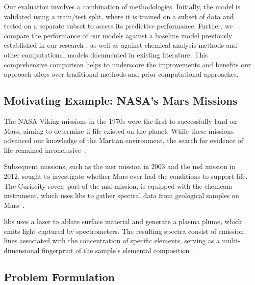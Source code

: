 Our evaluation involves a combination of methodologies. Initially, the model is validated using a train/test split, where it is trained on a subset of data and tested on a separate subset to assess its predictive performance. Further, we compare the performance of our models against a baseline model previously established in our research \cite{p9_paper}, as well as against chemical analysis methods and other computational models documented in existing literature. This comprehensive comparison helps to underscore the improvements and benefits our approach offers over traditional methods and prior computational approaches.





\subsection{Motivating Example: NASA's Mars Missions}
The NASA Viking missions in the 1970s were the first to successfully land on Mars, aiming to determine if life existed on the planet. 
While these missions advanced our knowledge of the Martian environment, the search for evidence of life remained inconclusive~\cite{marsnasagov_vikings}.

Subsequent missions, such as the \gls{mer} mission in 2003 and the \gls{msl} mission in 2012, sought to investigate whether Mars ever had the conditions to support life. 
The Curiosity rover, part of the \gls{msl} mission, is equipped with the \gls{chemcam} instrument, which uses \gls{libs} to gather spectral data from geological samples on Mars~\cite{wiensChemcam2012}.

\gls{libs} uses a laser to ablate surface material and generate a plasma plume, which emits light captured by spectrometers. 
The resulting spectra consist of emission lines associated with the concentration of specific elements, serving as a multi-dimensional fingerprint of the sample's elemental composition~\cite{cleggRecalibrationMarsScience2017}.

\subsection{Problem Formulation}


